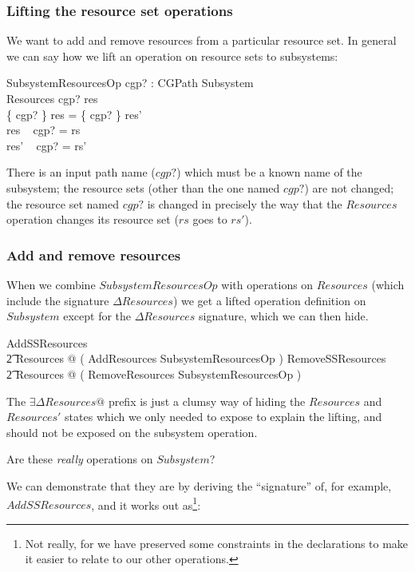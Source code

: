 \documentclass[a4paper,twoside,12pt]{article}
\begin{document}
\subsubsection{Lifting the resource set operations}
We want to add and remove resources from a particular resource set. In general we can say
how we lift an operation on resource sets to subsystems:

\begin{schema}{SubsystemResourcesOp}
cgp? : CGPath
\also
\Delta Subsystem \\
\Delta Resources
\where
cgp? \in \dom res \\
\{ cgp? \} \ndres res = \{ cgp? \} \ndres res' \\
res ~ cgp? = rs \\
res' ~ cgp? = rs'
\end{schema}
There is an input path name ($cgp?$) which must be a known name of the subsystem;
the resource sets (other than the one named $cgp?$) are not changed;
the resource set named $cgp?$ is changed in precisely the way that the $Resources$ operation changes
its resource set ($rs$ goes to $rs'$).

\subsubsection{Add and remove resources}
When we combine $SubsystemResourcesOp$ with operations on $Resources$
(which include the signature $\Delta Resources$)
we get a lifted operation definition on $Subsystem$ except for the $\Delta Resources$ signature,
which we can then hide.

\begin{zed}
AddSSResources  \\
\t2 \exists \Delta Resources @ ( AddResources \land SubsystemResourcesOp )
\also
RemoveSSResources  \\
\t2 \exists \Delta Resources @ ( RemoveResources \land SubsystemResourcesOp )
\end{zed}
The $\exists \Delta Resources @$ prefix is just a clumsy way of hiding the $Resources$ and $Resources'$ states
which we only needed to expose to explain the lifting, and should not be exposed on the
subsystem operation.

Are these \emph{really} operations on $Subsystem$?

We can demonstrate that they are by deriving the ``signature'' of, for example, $AddSSResources$,
and it works out as\footnote{Not really,
for we have preserved some constraints in the declarations to make it easier to relate to our other operations.}:
\end{document}
